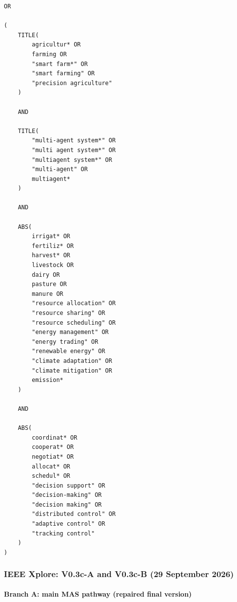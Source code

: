 \begin{lstlisting}
OR

(
    TITLE(
        agricultur* OR
        farming OR
        "smart farm*" OR
        "smart farming" OR
        "precision agriculture"
    )

    AND

    TITLE(
        "multi-agent system*" OR
        "multi agent system*" OR
        "multiagent system*" OR
        "multi-agent" OR
        multiagent*
    )

    AND

    ABS(
        irrigat* OR
        fertiliz* OR
        harvest* OR
        livestock OR
        dairy OR
        pasture OR
        manure OR
        "resource allocation" OR
        "resource sharing" OR
        "resource scheduling" OR
        "energy management" OR
        "energy trading" OR
        "renewable energy" OR
        "climate adaptation" OR
        "climate mitigation" OR
        emission*
    )

    AND

    ABS(
        coordinat* OR
        cooperat* OR
        negotiat* OR
        allocat* OR
        schedul* OR
        "decision support" OR
        "decision-making" OR
        "decision making" OR
        "distributed control" OR
        "adaptive control" OR
        "tracking control"
    )
)

\end{lstlisting}

\subsubsection{IEEE Xplore: V0.3c-A and V0.3c-B (29 September 2026)}

\paragraph{Branch A: main MAS pathway (repaired final version)}

